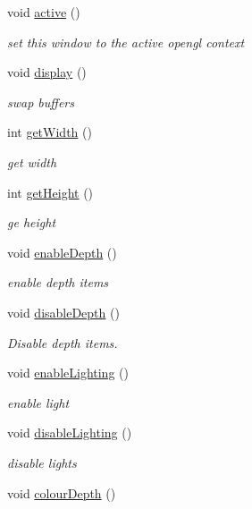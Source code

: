 \begin{DoxyCompactItemize}
void \hyperlink{class_window_a20e45797c9462dba56ae532fe76cb815}{active} ()
\begin{DoxyCompactList}\small\item\em set this window to the active opengl context \end{DoxyCompactList}\item 
void \hyperlink{class_window_afadfafa5a0b9472554759004aafb327e}{display} ()
\begin{DoxyCompactList}\small\item\em swap buffers \end{DoxyCompactList}\item 
int \hyperlink{class_window_a2d459fe21a48b6a41834a32a6c84fe2e}{get\-Width} ()
\begin{DoxyCompactList}\small\item\em get width \end{DoxyCompactList}\item 
int \hyperlink{class_window_a02acaaf02d8b63d4bd74d99482fe3a78}{get\-Height} ()
\begin{DoxyCompactList}\small\item\em ge height \end{DoxyCompactList}\item 
void \hyperlink{class_window_aeb09abe99d95c2a0e18b376a69ff1829}{enable\-Depth} ()
\begin{DoxyCompactList}\small\item\em enable depth items \end{DoxyCompactList}\item 
void \hyperlink{class_window_aef2dd56a6369e2833e8d28b1c136a92e}{disable\-Depth} ()
\begin{DoxyCompactList}\small\item\em Disable depth items. \end{DoxyCompactList}\item 
void \hyperlink{class_window_a0d3072ad7bb6198c4a8f8b2eee9cb65a}{enable\-Lighting} ()
\begin{DoxyCompactList}\small\item\em enable light \end{DoxyCompactList}\item 
void \hyperlink{class_window_a02569a6c097115bf19dab36eaa5887e0}{disable\-Lighting} ()
\begin{DoxyCompactList}\small\item\em disable lights \end{DoxyCompactList}\item 
void \hyperlink{class_window_ae802af8f8026e3cf48079b83a2fab65d}{colour\-Depth} ()

\end{DoxyCompactItemize}
